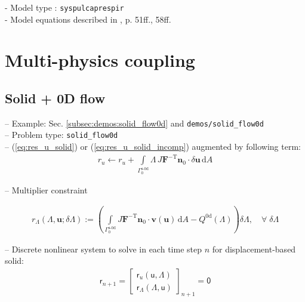 \documentclass[a4paper,12pt]{report}
\newcommand{\fS}{\text{s}}
\newcommand{\bs}[1]{\boldsymbol{#1}}
\newcommand{\Gm}{\mathit{\Gamma}}
\newcommand{\ROP}{\bs{\mathsf{r}}}
\newcommand{\LMZ}{\bs{\mathsf{\Lambda}}}
\begin{document}
- Model type : \verb.syspulcaprespir.\\

- Model equations described in \cite{hirschvogel2019disspub}, p. 51ff., 58ff.


\section{Multi-physics coupling}\label{sec:multiphys_coupling}

\subsection{Solid + 0D flow}\label{subsec:solid_flow0d}

-- Example: Sec. \ref{subsec:demos:solid_flow0d} and \verb"demos/solid_flow0d"\\

-- Problem type: \verb.solid_flow0d.\\

-- (\ref{eq:res_u_solid}) or (\ref{eq:res_u_solid_incomp}) augmented by following term:
\begin{align}
r_u \leftarrow r_u + \int\limits_{\Gm_0^{\fS\text{-}\mathrm{0d}}}\!\mathit{\Lambda}\,J\bs{F}^{-\mathrm{T}}\bs{n}_0\cdot\delta\bs{u}\,\mathrm{d}A
\end{align}

-- Multiplier constraint

\begin{align}
r_{\mathit{\Lambda}}(\mathit{\Lambda},\bs{u};\delta\mathit{\Lambda}):= \left(\int\limits_{\Gm_0^{\mathrm{\fS\text{-}0d}}}\! J\bs{F}^{-\mathrm{T}}\bs{n}_{0}\cdot\bs{v}(\bs{u})\,\mathrm{d}A - Q^{\mathrm{0d}}(\mathit{\Lambda})\right) \delta\mathit{\Lambda}, \quad \forall \; \delta\mathit{\Lambda}
\end{align}

-- Discrete nonlinear system to solve in each time step $n$ for displacement-based solid:
\begin{align}
\ROP_{n+1} = \begin{bmatrix} \ROP_{u}(\bs{\mathsf{u}},\LMZ) \\ \ROP_{\mathit{\Lambda}}(\LMZ,\bs{\mathsf{u}}) \end{bmatrix}_{n+1} = \bs{\mathsf{0}}\label{eq:nonlin_sys_solid_0d}
\end{align}
\end{document}
